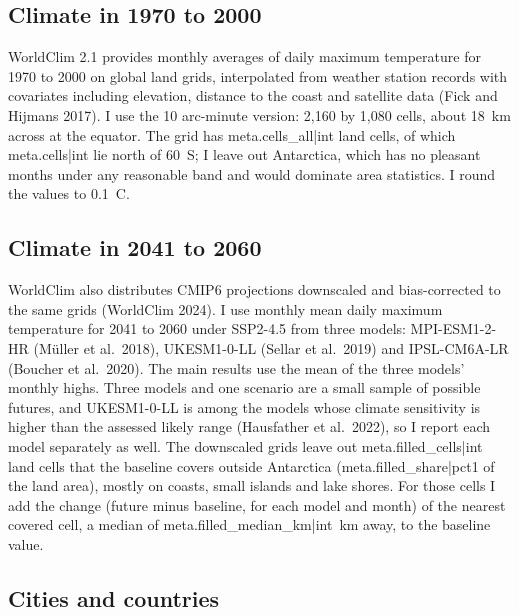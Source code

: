 \documentclass[11pt,a4paper]{article}
\begin{document}
\subsection{Climate in 1970 to 2000}

WorldClim 2.1 provides monthly averages of daily maximum temperature for 1970 to 2000 on global land grids, interpolated from weather station records with covariates including elevation, distance to the coast and satellite data (Fick and Hijmans 2017). I use the 10 arc-minute version: 2,160 by 1,080 cells, about 18~km across at the equator. The grid has {{meta.cells_all|int}} land cells, of which {{meta.cells|int}} lie north of 60\textdegree~S; I leave out Antarctica, which has no pleasant months under any reasonable band and would dominate area statistics. I round the values to 0.1~\textdegree C.

\subsection{Climate in 2041 to 2060}

WorldClim also distributes CMIP6 projections downscaled and bias-corrected to the same grids (WorldClim 2024). I use monthly mean daily maximum temperature for 2041 to 2060 under SSP2-4.5 from three models: MPI-ESM1-2-HR (M\"uller et al.\ 2018), UKESM1-0-LL (Sellar et al.\ 2019) and IPSL-CM6A-LR (Boucher et al.\ 2020). The main results use the mean of the three models' monthly highs. Three models and one scenario are a small sample of possible futures, and UKESM1-0-LL is among the models whose climate sensitivity is higher than the assessed likely range (Hausfather et al.\ 2022), so I report each model separately as well. The downscaled grids leave out {{meta.filled_cells|int}} land cells that the baseline covers outside Antarctica ({{meta.filled_share|pct1}} of the land area), mostly on coasts, small islands and lake shores. For those cells I add the change (future minus baseline, for each model and month) of the nearest covered cell, a median of {{meta.filled_median_km|int}}~km away, to the baseline value.

\subsection{Cities and countries}
\end{document}
